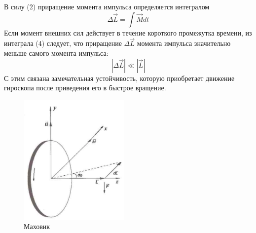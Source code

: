 \documentclass[a4paper,12pt]{article} %
\begin{document}
В силу (2) приращение момента импульса определяется интегралом
\begin{equation}
\Delta\overrightarrow{L} = \int\overrightarrow{M}dt
\end{equation}
Если момент внешних сил действует в течение короткого промежутка времени, из интеграла (4) следует, что приращение $\Delta\overrightarrow{L}$ момента импульса значительно меньше самого момента импульса:
\[|\Delta\overrightarrow{L}| \ll |\overrightarrow{L}|\]
С этим связана замечательная устойчивость, которую приобретает движение гироскопа после приведения его в быстрое вращение.
\begin{figure}
  \begin{center}
    \includegraphics[width=0.48\textwidth]{1}
  \end{center}
  \caption{Маховик}
\end{figure}
\end{document}
